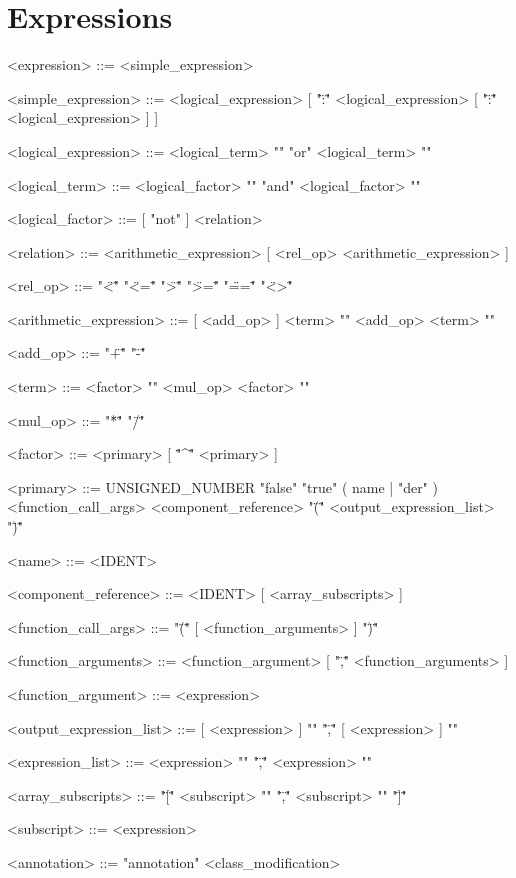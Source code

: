 \documentclass[11pt,a4paper,notitlepage]{report}
\begin{document}
\section{Expressions}

\begin{grammar}\scriptsize

<expression> ::=
<simple_expression>

<simple_expression> ::=
<logical_expression> [ "\":\"" <logical_expression> [ "\":\"" <logical_expression> ] ]

<logical_expression> ::=
<logical_term> "{" "or" <logical_term> "}"

<logical_term> ::=
<logical_factor> "{" "and" <logical_factor> "}"

<logical_factor> ::=
[ "not" ] <relation>

<relation> ::=
<arithmetic_expression> [ <rel_op> <arithmetic_expression> ]

<rel_op> ::=
"\"<\"" 
\alt "\"<=\"" 
\alt "\">\"" 
\alt "\">=\"" 
\alt "\"==\"" 
\alt "\"<>\""

<arithmetic_expression> ::=
[ <add_op> ] <term> "{" <add_op> <term> "}"

<add_op> ::=
"\"+\""
\alt "\"-\""

<term> ::=
<factor> "{" <mul_op> <factor> "}"

<mul_op> ::=
"\"*\""
\alt "\"/\"" 

<factor> ::=
<primary> [ "\"^\"" <primary> ]

<primary> ::=
UNSIGNED_NUMBER
\alt "false"
\alt "true"
\alt ( name | "der" ) <function_call_args>
\alt <component_reference>
\alt "\"(\"" <output_expression_list> "\")\""

<name> ::=
<IDENT> 

<component_reference> ::=
<IDENT> [ <array_subscripts> ] 

<function_call_args> ::=
"\"(\"" [ <function_arguments> ] "\")\""

<function_arguments> ::=
<function_argument> [ "\",\"" <function_arguments> ]

<function_argument> ::=
<expression>

<output_expression_list> ::=
[ <expression> ] "{" "\",\"" [ <expression> ] "}"

<expression_list> ::=
<expression> "{" "\",\"" <expression> "}"

<array_subscripts> ::=
"\"[\"" <subscript> "{" "\",\"" <subscript> "}" "\"]\""

<subscript> ::=
<expression>

<annotation> ::=
"annotation" <class_modification>
\end{grammar}
\end{document}
